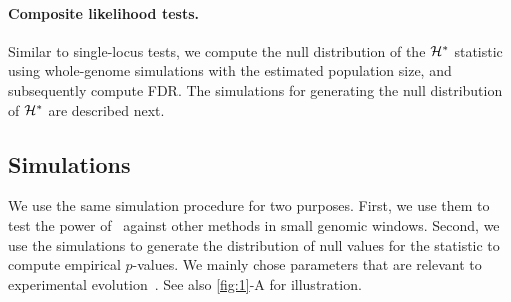 \paragraph{Composite likelihood tests.}

Similar to single-locus tests, we compute the null distribution of the
${\cal H}^*$ statistic using whole-genome simulations with the estimated
population size, and subsequently compute FDR. The simulations for
generating the null distribution of ${\cal H}^*$ are described next. 

\subsection{Simulations}\label{sec:sims}
We use the same simulation procedure for two purposes. First, we use
them to test the power of \comale\ against other methods in small
genomic windows. Second, we use the simulations to generate the
distribution of null values for the statistic to compute empirical
$p$-values. We mainly chose parameters that are relevant to \dmel
experimental evolution~\cite{kofler2013guide}. See also \ref{fig:1}-A
for illustration. 
